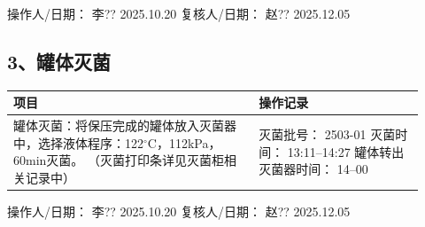 \documentclass[UTF8,10pt,a4paper,fontset=fandol]{ctexart}
\newcommand{\fieldvalue}[1]{#1}
\newcommand{\handwritten}[1]{#1}
\begin{document}
\medskip

操作人/日期：
\fieldvalue{\handwritten{李??}}
\quad
\fieldvalue{\handwritten{2025.10.20}}
\hfill
复核人/日期：
\fieldvalue{\handwritten{赵??}}
\quad
\fieldvalue{\handwritten{2025.12.05}}

\subsection*{3、罐体灭菌}

\begin{tabular}{|p{0.55\linewidth}|p{0.37\linewidth}|}
\hline
\centering 项目 & \centering 操作记录\\ \hline
罐体灭菌：将保压完成的罐体放入灭菌器中，选择液体程序：122$^\circ$C，112kPa，60min灭菌。\newline
（灭菌打印条详见灭菌柜相关记录中）
&
灭菌批号：
\fieldvalue{\handwritten{2503-01}}\newline
灭菌时间：
\fieldvalue{\handwritten{13:11--14:27}}\newline
罐体转出灭菌器时间：
\fieldvalue{\handwritten{14--00}}
\\ \hline
\end{tabular}

\medskip

操作人/日期：
\fieldvalue{\handwritten{李??}}
\quad
\fieldvalue{\handwritten{2025.10.20}}
\hfill
复核人/日期：
\fieldvalue{\handwritten{赵??}}
\quad
\fieldvalue{\handwritten{2025.12.05}}
\end{document}
